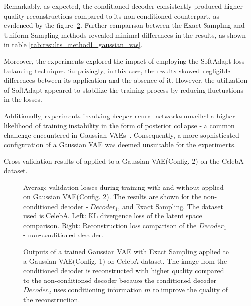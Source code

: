 Remarkably, as expected, the conditioned decoder consistently produced higher-quality reconstructions compared to its non-conditioned counterpart, as evidenced by the figure~\ref{fig:rec_gaussian}. Further comparison between the Exact Sampling and Uniform Sampling methods revealed minimal differences in the results, as shown in table \ref{tab:results_method1_gaussian_vae}.

Moreover, the experiments explored the impact of employing the SoftAdapt loss balancing technique. Surprisingly, in this case, the results showed negligible differences between its application and the absence of it. However, the utilization of SoftAdapt appeared to stabilize the training process by reducing fluctuations in the losses.

Additionally, experiments involving deeper neural networks unveiled a higher likelihood of training instability in the form of posterior collapse - a common challenge encountered in Gaussian VAEs~\cite{wang2023posterior}. Consequently, a more sophisticated configuration of a Gaussian VAE was deemed unsuitable for the experiments.

\begin{table}[H]
    \centering
    
    \caption{Cross-validation results of  applied to a Gaussian VAE(Config. 2) on the CelebA dataset.}
    \label{tab:results_method1_gaussian_vae}
\end{table}

\begin{figure}[H]
    \centering
    \scalebox{0.48}{}
    \scalebox{0.48}{}
    \caption[Validation loss during training of a Gaussian VAE.]
    {
        Average validation losses during training with and without  applied on Gaussian VAE(Config. 2). The results are shown for the non-conditioned decoder - $Decoder_1$, and Exact Sampling. The dataset used is CelebA.
        Left: KL divergence loss of the latent space comparison. Right: Reconstruction loss comparison of the $Decoder_1$ - non-conditioned decoder.
    }
    \label{fig:results_method1_gaussian_vae}
\end{figure}


\begin{figure}[H]
    \centering
    
    \caption[Trained neural network with  applied to a Gaussian VAE.]
    { 
        Outputs of a trained Gaussian VAE with  Exact Sampling applied to a Gaussian VAE(Config. 1) on CelebA dataset. The image from the conditioned decoder is reconstructed with higher quality compared to the non-conditioned decoder because the conditioned decoder $Decoder_2$ uses conditioning information $m$ to improve the quality of the reconstruction.
    }
    \label{fig:rec_gaussian}
\end{figure}

